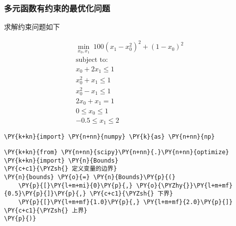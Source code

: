     \hypertarget{ux591aux5143ux51fdux6570ux6709ux7ea6ux675fux7684ux6700ux4f18ux5316ux95eeux9898}{%
\subsubsection{多元函数有约束的最优化问题}\label{ux591aux5143ux51fdux6570ux6709ux7ea6ux675fux7684ux6700ux4f18ux5316ux95eeux9898}}

    求解约束问题如下

    \[
    \begin{aligned}
\min\limits_{x_0,x_1}\; 100(x_1-x^2_0)^2+(1-x_0)^2\\
\text{subject to:}\\
x_0+2x_1\le 1\\
x^2_0+x_1\le 1\\
x^2_0-x_1\le 1\\
2x_0+x_1=1\\
0\le x_0\le 1\\
-0.5\le x_1\le 2
\end{aligned}
\]

    \begin{tcolorbox}[breakable, size=fbox, boxrule=1pt, pad at break*=1mm,colback=cellbackground, colframe=cellborder]
\begin{Verbatim}[commandchars=\\\{\}]
\PY{k+kn}{import} \PY{n+nn}{numpy} \PY{k}{as} \PY{n+nn}{np}
\end{Verbatim}
\end{tcolorbox}

    \begin{tcolorbox}[breakable, size=fbox, boxrule=1pt, pad at break*=1mm,colback=cellbackground, colframe=cellborder]
\begin{Verbatim}[commandchars=\\\{\}]
\PY{k+kn}{from} \PY{n+nn}{scipy}\PY{n+nn}{.}\PY{n+nn}{optimize} \PY{k+kn}{import} \PY{n}{Bounds}
\PY{c+c1}{\PYZsh{} 定义变量的边界}
\PY{n}{bounds} \PY{o}{=} \PY{n}{Bounds}\PY{p}{(}
    \PY{p}{[}\PY{l+m+mi}{0}\PY{p}{,} \PY{o}{\PYZhy{}}\PY{l+m+mf}{0.5}\PY{p}{]}\PY{p}{,} \PY{c+c1}{\PYZsh{} 下界}
    \PY{p}{[}\PY{l+m+mf}{1.0}\PY{p}{,} \PY{l+m+mf}{2.0}\PY{p}{]} \PY{c+c1}{\PYZsh{} 上界}
\PY{p}{)}
\end{Verbatim}
\end{tcolorbox}

